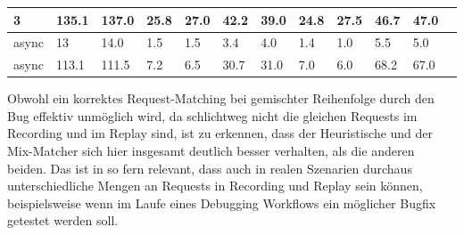 \documentclass[12pt,a4paper]{report}
\begin{document}
\begin{table}[h]
\begin{tabular}{|l|l|l|l|l|l|l|l|l|l|l|l|}
		3                        & 135.1                              & 137.0                           & 25.8                        & 27.0                      & 42.2                           & 39.0   & 24.8 & 27.5   & 46.7 & 47.0   \\ \hline
		async                    & 13                                 & 14.0                            & 1.5                         & 1.5                       & 3.4                            & 4.0    & 1.4  & 1.0    & 5.5  & 5.0    \\ \hline
		async                    & 113.1                              & 111.5                           & 7.2                         & 6.5                       & 30.7                           & 31.0   & 7.0  & 6.0    & 68.2 & 67.0   \\ \hline
	\end{tabular}
\end{table}

Obwohl ein korrektes Request-Matching bei gemischter Reihenfolge durch den Bug effektiv unmöglich wird, da schlichtweg nicht die
gleichen Requests im Recording und im Replay sind, ist zu erkennen, dass der Heuristische und der Mix-Matcher sich hier insgesamt
deutlich besser verhalten, als die anderen beiden. Das ist in so fern relevant, dass auch in realen Szenarien durchaus
unterschiedliche Mengen an Requests in Recording und Replay sein können, beispielsweise wenn im Laufe eines Debugging Workflows
ein möglicher Bugfix getestet werden soll.
\end{document}
